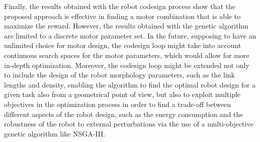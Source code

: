 Finally, the results obtained with the robot codesign process show that the proposed approach is effective in finding a motor combination that is able to maximize the reward. However, the results obtained with the genetic algorithm are limited to a discrete motor parameter set. In the future, supposing to have an unlimited choice for motor design, the codesign loop might take into account continuous search spaces for the motor parameters, which would allow for more in-depth optimization. Moreover, the codesign loop might be extended not only to include the design of the robot morphology parameters, such as the link lengths and density, enabling the algorithm to find the optimal robot design for a given task also from a geometrical point of view, but also to exploit multiple objectives in the optimization process in order to find a trade-off between different aspects of the robot design, such as the energy consumption and the robustness of the robot to external perturbations via the use of a multi-objective genetic algorithm like \ac{NSGA}-III.
